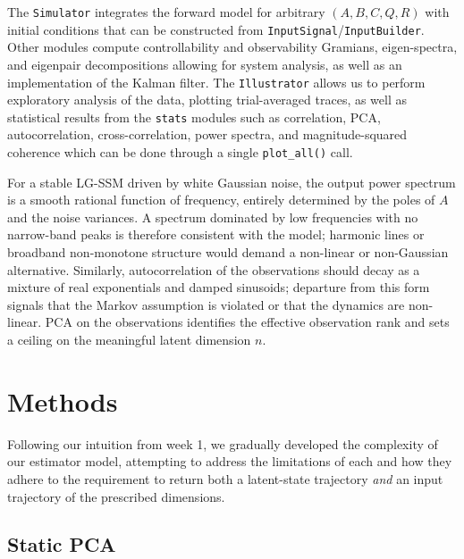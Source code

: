 \documentclass[11pt,a4paper]{article}
\begin{document}
\begin{sloppypar}
The \texttt{Simulator} integrates the forward model for arbitrary $(A, B, C, Q, R)$ with initial conditions that can be constructed from \texttt{InputSignal}/\texttt{InputBuilder}. Other modules compute controllability and observability Gramians, eigen-spectra, and eigenpair decompositions allowing for system analysis, as well as an implementation of the Kalman filter. The \texttt{Illustrator} allows us to perform exploratory analysis of the data, plotting trial-averaged traces, as well as statistical results from the \texttt{stats} modules such as correlation, PCA, autocorrelation, cross-correlation, power spectra, and magnitude-squared coherence which can be done through a single \texttt{plot\_all()} call.
\end{sloppypar}

For a stable LG-SSM driven by white Gaussian noise, the output power spectrum is a smooth rational function of frequency, entirely determined by the poles of $A$ and the noise variances. A spectrum dominated by low frequencies with no narrow-band peaks is therefore consistent with the model; harmonic lines or broadband non-monotone structure would demand a non-linear or non-Gaussian alternative. Similarly, autocorrelation of the observations should decay as a mixture of real exponentials and damped sinusoids; departure from this form signals that the Markov assumption is violated or that the dynamics are non-linear.
PCA on the observations identifies the effective observation rank and sets a ceiling on the meaningful latent dimension $n$. 

\section{Methods}

Following our intuition from week 1, we gradually developed the complexity of our estimator model, attempting to address the limitations of each and how they adhere to the requirement to return both a latent-state trajectory \emph{and} an input trajectory of the prescribed dimensions.

\subsection{Static PCA}
\end{document}
